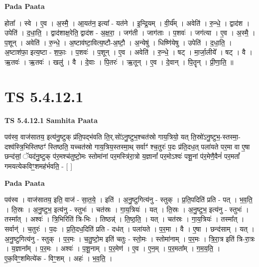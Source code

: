 \documentclass[17pt]{extarticle}
\begin{document}
\textbf{Pada Paata} \newline

होता᳚ । स्वे । ए॒व । अ॒स्मै॒ । आ॒यत॑न॒ इत्या᳚ - यत॑ने । इ॒न्द्रि॒यम् । वी॒र्य᳚म् । अवेति॑ । रु॒न्धे॒ । द्वाद॑श । उपेति॑ । द॒धा॒ति॒ । द्वाद॑शाक्ष॒रेति॒ द्वाद॑श - अ॒क्ष॒रा॒ । जग॑ती । जाग॑ताः । प॒शवः॑ । जग॑त्या । ए॒व । अ॒स्मै॒ । प॒शून् । अवेति॑ । रु॒न्धे॒ । अ॒ष्टाव॑ष्टा॒वित्य॒ष्टौ-अ॒ष्टौ॒ । अ॒न्येषु॑ । धिष्णि॑येषु । उपेति॑ । द॒धा॒ति॒ । अ॒ष्टाश॑फा॒ इत्य॒ष्टा - श॒फाः॒ । प॒शवः॑ । प॒शून् । ए॒व । अवेति॑ । रु॒न्धे॒ । षट् । मा॒र्जा॒लीये᳚ । षट् । वै । ऋ॒तवः॑ । ऋ॒तवः॑ । खलु॑ । वै । दे॒वाः । पि॒तरः॑ । ऋ॒तून् । ए॒व । दे॒वान् । पि॒तॄन् । प्री॒णा॒ति॒ ॥  \newline





\section{ TS 5.4.12.1 }

\textbf{TS 5.4.12.1 } \newline
\textbf{Samhita Paata} \newline

पव॑स्व॒ वाज॑सातय॒ इत्य॑नु॒ष्टुक् प्र॑ति॒पद्भ॑वति ति॒र्.सो॑ऽनु॒ष्टुभ॒श्चत॑स्रो गाय॒त्रियो॒ यत् ति॒स्रो॑ऽनु॒ष्टुभ॒-स्तस्मा॒-दश्व॑स्त्रि॒भिस्तिष्ठꣳ॑ स्तिष्ठति॒ यच्चत॑स्रो गाय॒त्रिय॒स्तस्मा॒थ् सर्वाꣳ॑ श्च॒तुरः॑ प॒दः प्र॑ति॒दध॒त् पला॑यते पर॒मा वा ए॒षा छन्द॑सां॒ ॅयद॑नु॒ष्टुक् प॑र॒मश्च॑तुष्टो॒मः स्तोमा॑नां पर॒मस्त्रि॑रा॒त्रो य॒ज्ञानां᳚ पर॒मोऽश्वः॑ पशू॒नां प॑र॒मेणै॒वैनं॑ पर॒मतां᳚ गमयत्येकविꣳ॒॒शमह॑र्भवति॒ - [  ] \newline

\textbf{Pada Paata} \newline

पव॑स्व । वाज॑सातय॒ इति॒ वाज॑ - सा॒त॒ये॒ । इति॑ । अ॒नु॒ष्टुगित्य॑नु - स्तुक् । प्र॒ति॒पदिति॑ प्रति - पत् । भ॒व॒ति॒ । ति॒स्रः । अ॒नु॒ष्टुभ॒ इत्य॑नु - स्तुभः॑ । चत॑स्रः । गा॒य॒त्रियः॑ । यत् । ति॒स्रः । अ॒नु॒ष्टुभ॒ इत्य॑नु - स्तुभः॑ । तस्मा᳚त् । अश्वः॑ । त्रि॒भिरिति॑ त्रि-भिः । तिष्ठन्न्॑ । ति॒ष्ठ॒ति॒ । यत् । चत॑स्रः । गा॒य॒त्रियः॑ । तस्मा᳚त् । सर्वान्॑ । च॒तुरः॑ । प॒दः । प्र॒ति॒दध॒दिति॑ प्रति - दध॑त् । पला॑यते । प॒र॒मा । वै । ए॒षा । छन्द॑साम् । यत् । अ॒नु॒ष्टुगित्य॑नु - स्तुक् । प॒र॒मः । च॒तु॒ष्टो॒म इति॑ चतुः - स्तो॒मः । स्तोमा॑नाम् । प॒र॒मः । त्रि॒रा॒त्र इति॑ त्रि-रा॒त्रः । य॒ज्ञाना᳚म् । प॒र॒मः । अश्वः॑ । प॒शू॒नाम् । प॒र॒मेण॑ । ए॒व । ए॒न॒म् । प॒र॒मता᳚म् । ग॒म॒य॒ति॒ । ए॒क॒विꣳ॒॒शमित्ये॑क - विꣳ॒॒शम् । अहः॑ । भ॒व॒ति॒ ।  \newline
\end{document}
